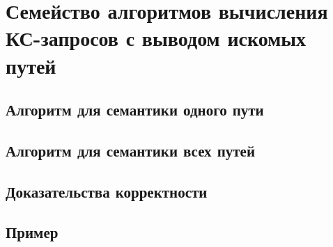 \chapter{Семейство алгоритмов вычисления КС-запросов с выводом искомых путей}\label{ch:ch3}

\section{Алгоритм для семантики одного пути}\label{sec:ch3/sect1}
\section{Алгоритм для семантики всех путей}\label{sec:ch3/sect2}
\section{Доказательства корректности}\label{sec:ch3/sect3}
\section{Пример}\label{sec:ch3/sect4}

\clearpage
